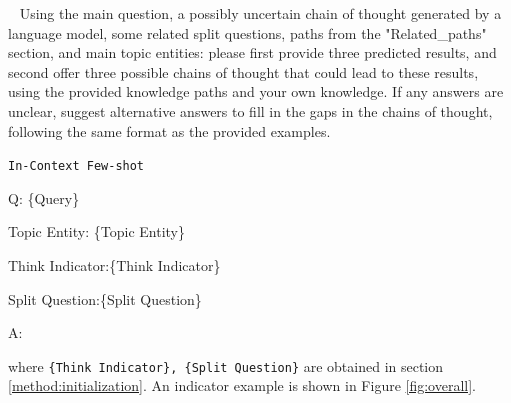 \begin{center}
\begin{minipage}{0.7\columnwidth}
    \vspace{2mm}
    \begin{tcolorbox}[title=LLM Supplement Prompt Template]~\label{prompts_LLM_Supplement}
        \small
Using the main question, a possibly uncertain chain of thought generated by a language model, some related split questions, paths from the "Related\_paths" section, and main topic entities:
please first provide three predicted results,
and second offer three possible chains of thought that could lead to these results, using the provided knowledge paths and your own knowledge.
If any answers are unclear, suggest alternative answers to fill in the gaps in the chains of thought, following the same format as the provided examples.

\vspace{5pt}

\texttt{In-Context Few-shot}
\vspace{5pt}

Q: \{Query\} 

Topic Entity: \{Topic Entity\} 

Think Indicator:\{Think Indicator\}

Split Question:\{Split Question\}

A: 
    \end{tcolorbox}
    \vspace{2mm}
\end{minipage}
\end{center}
where \texttt{\{Think Indicator\},  \{Split Question\}} are obtained in section \ref{method:initialization}. An indicator example is shown in Figure \ref{fig:overall}.

